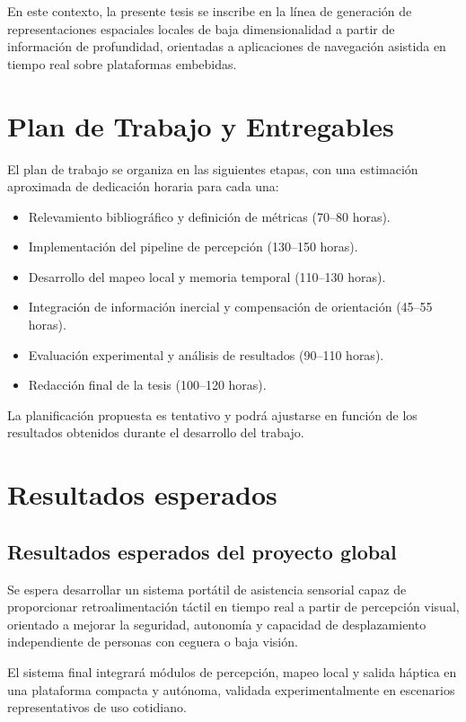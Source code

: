 En este contexto, la presente tesis se inscribe en la línea de generación de representaciones espaciales locales de baja
dimensionalidad a partir de información de profundidad, orientadas a aplicaciones de navegación asistida en tiempo real
sobre plataformas embebidas.

\section{Plan de Trabajo y Entregables}

El plan de trabajo se organiza en las siguientes etapas, con una estimación aproximada de dedicación horaria para cada una:
\begin{itemize}
    \item Relevamiento bibliográfico y definición de métricas (70--80 horas).
    \item Implementación del pipeline de percepción (130--150 horas).
    \item Desarrollo del mapeo local y memoria temporal (110--130 horas).
    \item Integración de información inercial y compensación de orientación (45--55 horas).
    \item Evaluación experimental y análisis de resultados (90--110 horas).
    \item Redacción final de la tesis (100--120 horas).
\end{itemize}

La planificación propuesta es tentativo y podrá ajustarse en función de los resultados obtenidos durante el desarrollo del trabajo.

\section{Resultados esperados}

\subsection{Resultados esperados del proyecto global}

Se espera desarrollar un sistema portátil de asistencia sensorial capaz de proporcionar retroalimentación
táctil en tiempo real a partir de percepción visual, orientado a mejorar la seguridad, autonomía y capacidad
de desplazamiento independiente de personas con ceguera o baja visión.

El sistema final integrará módulos de percepción, mapeo local y salida háptica en una plataforma compacta y
autónoma, validada experimentalmente en escenarios representativos de uso cotidiano.

